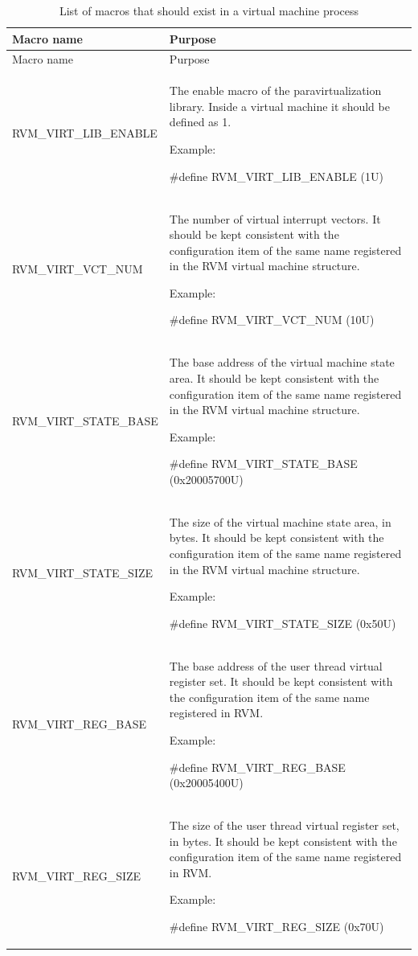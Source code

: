 \begin{xltabular}{\textwidth}{@{}>{\hsize\raggedright\arraybackslash}X>{\hsize\raggedright\arraybackslash}X@{}}
\caption{List of macros that should exist in a virtual machine process}\label{tab:4-3}\\
\toprule
Macro name & Purpose\tabularnewline
\endfirsthead
\toprule
Macro name & Purpose\tabularnewline
\midrule
\endhead
\bottomrule
\endlastfoot
RVM\_\allowbreak{}VIRT\_\allowbreak{}LIB\_\allowbreak{}ENABLE\strut
 & The enable macro of the paravirtualization library. Inside a virtual machine it should be defined as 1.

Example:

\#define RVM\_\allowbreak{}VIRT\_\allowbreak{}LIB\_\allowbreak{}ENABLE (1U)\strut
\tabularnewline
RVM\_\allowbreak{}VIRT\_\allowbreak{}VCT\_\allowbreak{}NUM\strut
 & The number of virtual interrupt vectors. It should be kept consistent with the configuration item of the same name registered in the RVM virtual machine structure.

Example:

\#define RVM\_\allowbreak{}VIRT\_\allowbreak{}VCT\_\allowbreak{}NUM (10U)\strut
\tabularnewline
RVM\_\allowbreak{}VIRT\_\allowbreak{}STATE\_\allowbreak{}BASE\strut
 & The base address of the virtual machine state area. It should be kept consistent with the configuration item of the same name registered in the RVM virtual machine structure.

Example:

\#define RVM\_\allowbreak{}VIRT\_\allowbreak{}STATE\_\allowbreak{}BASE (0x20005700U)\strut
\tabularnewline
RVM\_\allowbreak{}VIRT\_\allowbreak{}STATE\_\allowbreak{}SIZE\strut
 & The size of the virtual machine state area, in bytes. It should be kept consistent with the configuration item of the same name registered in the RVM virtual machine structure.

Example:

\#define RVM\_\allowbreak{}VIRT\_\allowbreak{}STATE\_\allowbreak{}SIZE (0x50U)\strut
\tabularnewline
RVM\_\allowbreak{}VIRT\_\allowbreak{}REG\_\allowbreak{}BASE\strut
 & The base address of the user thread virtual register set. It should be kept consistent with the configuration item of the same name registered in RVM.

Example:

\#define RVM\_\allowbreak{}VIRT\_\allowbreak{}REG\_\allowbreak{}BASE (0x20005400U)\strut
\tabularnewline
RVM\_\allowbreak{}VIRT\_\allowbreak{}REG\_\allowbreak{}SIZE\strut
 & The size of the user thread virtual register set, in bytes. It should be kept consistent with the configuration item of the same name registered in RVM.

Example:

\#define RVM\_\allowbreak{}VIRT\_\allowbreak{}REG\_\allowbreak{}SIZE (0x70U)\strut
\tabularnewline
\end{xltabular}

